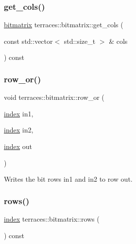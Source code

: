 \mbox{\label{classterraces_1_1bitmatrix_a0da6fd3a2321c19fdb802ba825d83d24}} 
\subsubsection{\texorpdfstring{get\+\_\+cols()}{get\_cols()}}
{\footnotesize\ttfamily \hyperlink{classterraces_1_1bitmatrix}{bitmatrix} terraces\+::bitmatrix\+::get\+\_\+cols (\begin{DoxyParamCaption}\item[{const std\+::vector$<$ std\+::size\+\_\+t $>$ \&}]{cols }\end{DoxyParamCaption}) const}

\mbox{\label{classterraces_1_1bitmatrix_a36a4964456f0d7f0eeb389e42124fa84}} 
\subsubsection{\texorpdfstring{row\+\_\+or()}{row\_or()}}
{\footnotesize\ttfamily void terraces\+::bitmatrix\+::row\+\_\+or (\begin{DoxyParamCaption}\item[{\hyperlink{namespaceterraces_adbc33ccb543d1634e96d0eb02e472c77}{index}}]{in1,  }\item[{\hyperlink{namespaceterraces_adbc33ccb543d1634e96d0eb02e472c77}{index}}]{in2,  }\item[{\hyperlink{namespaceterraces_adbc33ccb543d1634e96d0eb02e472c77}{index}}]{out }\end{DoxyParamCaption})}

Writes the bit rows \textquotesingle{}in1\textquotesingle{} and \textquotesingle{}in2\textquotesingle{} to row \textquotesingle{}out\textquotesingle{}. \mbox{\label{classterraces_1_1bitmatrix_a7e19b0df5f60d1bd76cda27987bac1ad}} 
\subsubsection{\texorpdfstring{rows()}{rows()}}
{\footnotesize\ttfamily \hyperlink{namespaceterraces_adbc33ccb543d1634e96d0eb02e472c77}{index} terraces\+::bitmatrix\+::rows (\begin{DoxyParamCaption}{ }\end{DoxyParamCaption}) const}

